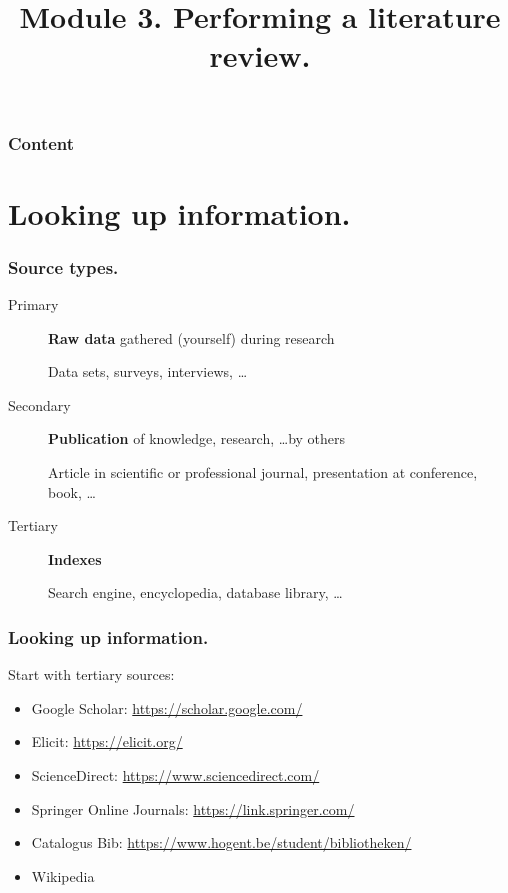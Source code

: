 \documentclass[aspectratio=169]{beamer}
\title{Module 3. Performing a literature review.}
\subtitle{\coursename}
\author{\lecturers}   %
\date{\academicyear}
\begin{document}
\begin{frame}
    \maketitle
\end{frame}

\begin{frame}
    \frametitle{Content}

    \tableofcontents
\end{frame}

\section{Looking up information.}

\begin{frame}
    \frametitle{Source types.}

    \begin{description}
        \item[Primary] \textbf{Raw data} gathered (yourself) during research

            Data sets, surveys, interviews, \ldots

        \item[Secondary] \textbf{Publication} of knowledge, research, \ldots by others

            Article in scientific or professional journal, presentation at conference, book, \ldots

        \item[Tertiary] \textbf{Indexes}

            Search engine, encyclopedia, database library, \ldots

    \end{description}

\end{frame}

\begin{frame}
    \frametitle{Looking up information.}

    Start with \alert{tertiary} sources:

    \begin{itemize}
        \item Google Scholar: \url{https://scholar.google.com/}
        \item Elicit: \url{https://elicit.org/}
        \item ScienceDirect: \url{https://www.sciencedirect.com/}
        \item Springer Online Journals: \url{https://link.springer.com/}
        \item Catalogus Bib: \url{https://www.hogent.be/student/bibliotheken/}
        \item Wikipedia
    \end{itemize}
\end{frame}
\end{document}
